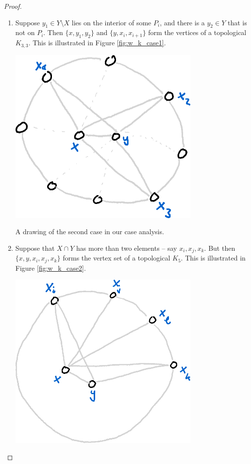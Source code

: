 \documentclass[nobib]{tufte-handout}
\begin{document}
\begin{lemma}
\begin{proof}
    \begin{enumerate}
      \item Suppose $y_1 \in Y \setminus X$ lies on the interior of some $P_i$, and there is a $y_2 \in Y$ that is not on $P_i$. Then $\{x, y_1, y_2\}$ and $\{y, x_i, x_{i+1}\}$ form the vertices of a topological $K_{3,3}$. This is illustrated in Figure \ref{fig:w_k_case1}.
      \begin{marginfigure}
        \centering
        \includegraphics[width=0.75\textwidth]{graphics/L11_planarity/w_k_case2.png}
        \caption[]{A drawing of the second case in our case analysis.}
        \label{fig:w_k_case2}
      \end{marginfigure}
      \item Suppose that $X \cap Y$ has more than two elements -- say $x_i, x_j, x_k$. But then $\{x, y, x_i, x_j, x_k\}$ forms the vertex set of a topological $K_5$. This is illustrated in Figure \ref{fig:w_k_case2}.
      \begin{marginfigure}
        \centering
        \includegraphics[width=0.75\textwidth]{graphics/L11_planarity/w_k_case3.png}

\end{marginfigure}
\end{enumerate}
\end{proof}
\end{lemma}
\end{document}
